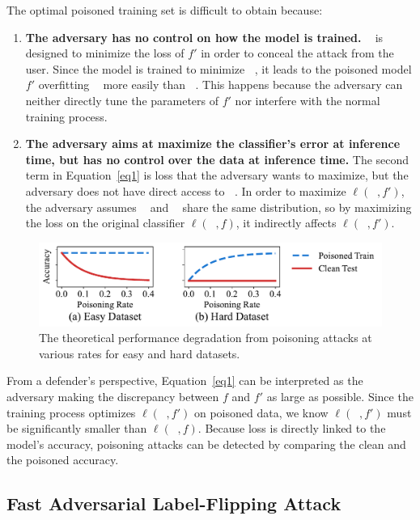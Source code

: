 \documentclass[runningheads]{llncs}
\DeclareMathOperator*{\Dpo}{\mathcal{D}^\prime_\text{train}}
\DeclareMathOperator*{\Dtr}{\mathcal{D}_\text{train}}
\DeclareMathOperator*{\Dte}{\mathcal{D}_\text{test}}
\begin{document}
The optimal poisoned training set is difficult to obtain because:
\begin{enumerate}
\item \textbf{The adversary has no control on how the model is trained.} 
$\Dpo$ is designed to minimize the loss of $f'$ in order to conceal the attack from the user.
Since the model is trained to minimize $\Dpo$, it leads to the poisoned model $f'$ overfitting $\Dpo$ more easily than $\Dtr$.
This happens because the adversary can neither directly tune the parameters of $f'$ nor interfere with the normal training process.

\item \textbf{The adversary aims at maximize the classifier's error at inference time, but has no control over the data at inference time.}
The second term in Equation~\ref{eq1} is loss that the adversary wants to maximize, but the adversary does not have direct access to $\Dte$.
In order to maximize $\ell(\Dte, f')$, the adversary assumes $\Dtr$ and $\Dte$ share the same distribution, so by maximizing the loss on the original classifier $\ell(\Dpo, f)$, it indirectly affects $\ell(\Dte, f')$.
\end{enumerate}

\begin{figure}[t!]
    \centering
    \includegraphics[width=\columnwidth]{images/fake_acc.pdf}
    \caption[Theoretical Performance Degradation Under Poisoning Attacks.]{The theoretical performance degradation from poisoning attacks at various rates for easy and hard datasets.}
    \label{fig.fake}
\end{figure}

From a defender's perspective,
Equation~\ref{eq1} can be interpreted as the adversary making the discrepancy between $f$ and $f'$ as large as possible.
Since the training process optimizes $\ell(\Dpo, f')$ on poisoned data,
we know $\ell(\Dpo, f')$ must be significantly smaller than $\ell(\Dpo, f)$.
Because loss is directly linked to the model's accuracy, poisoning attacks can be detected by comparing the clean and the poisoned accuracy.

\subsection{Fast Adversarial Label-Flipping Attack}
\label{sec:method:falfa}
\end{document}
